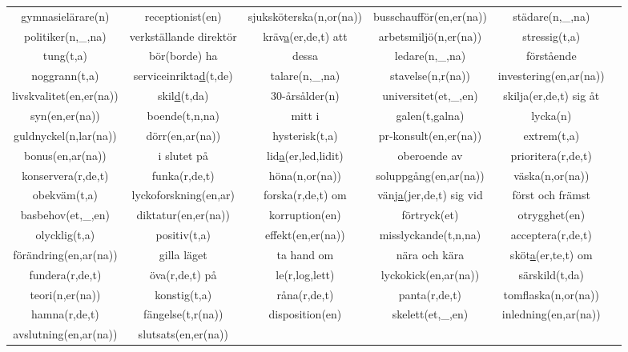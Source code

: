 \begin{center}
\begin{adjustwidth}{-2.5cm}{}
\begin{tabular}{|c c c c c c|}
            gymnasielärare(n) & receptionist(en) & sjuksköterska(n,or(na)) & busschaufför(en,er(na)) & städare(n,\_,na) &  \\
            politiker(n,\_,na) & verkställande direktör & kräv\underline{a}(er,de,t) att & arbetsmiljö(n,er(na)) & stressig(t,a) &  \\
            tung(t,a) & bör(borde) ha & dessa & ledare(n,\_,na) & förstående &  \\
            noggrann(t,a) & serviceinrikta\underline{d}(t,de) & talare(n,\_,na) & stavelse(n,r(na)) & investering(en,ar(na)) &  \\
            livskvalitet(en,er(na)) & skil\underline{d}(t,da) & 30-årsålder(n) & universitet(et,\_,en) & skilja(er,de,t) sig åt &  \\
            syn(en,er(na)) & boende(t,n,na) & mitt i & galen(t,galna) & lycka(n) &  \\
            guldnyckel(n,lar(na)) & dörr(en,ar(na)) & hysterisk(t,a) & pr-konsult(en,er(na)) & extrem(t,a) &  \\
            bonus(en,ar(na)) & i slutet på & lid\underline{a}(er,led,lidit) & oberoende av & prioritera(r,de,t) &  \\
            konservera(r,de,t) & funka(r,de,t) & höna(n,or(na)) & soluppgång(en,ar(na)) & väska(n,or(na)) &  \\
            obekväm(t,a) & lyckoforskning(en,ar) & forska(r,de,t) om & vän\underline{ja}(jer,de,t) sig vid & först och främst &  \\
            basbehov(et,\_,en) & diktatur(en,er(na)) & korruption(en) & förtryck(et) & otrygghet(en) &  \\
            olycklig(t,a) & positiv(t,a) & effekt(en,er(na)) & misslyckande(t,n,na) & acceptera(r,de,t) &  \\
            förändring(en,ar(na)) & gilla läget & ta hand om & nära och kära & sköt\underline{a}(er,te,t) om &  \\
            fundera(r,de,t) & öva(r,de,t) på & le(r,log,lett) & lyckokick(en,ar(na)) & särskild(t,da) &  \\
            teori(n,er(na)) & konstig(t,a) & råna(r,de,t) & panta(r,de,t) & tomflaska(n,or(na)) &  \\
            hamna(r,de,t) & fängelse(t,r(na)) & disposition(en) & skelett(et,\_,en) & inledning(en,ar(na)) &  \\
            avslutning(en,ar(na)) & slutsats(en,er(na)) &  &  &  &  \\
            \hline
        \end{tabular}
    \end{adjustwidth}
\end{center}

